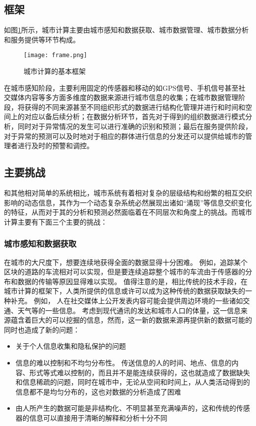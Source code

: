 \subsection{框架}
如图\ref{fig:1.1}所示，城市计算主要由城市感知和数据获取、城市数据管理、城市数据分析和服务提供等环节构成。
\begin{figure}[ht]
\centering
\texttt{[image: frame.png]}
\caption{城市计算的基本框架\cite{zheng2014urban}}
\label{fig:1.1}
\end{figure}
在城市感知阶段，主要利用固定的传感器和移动的如GPS信号、手机信号甚至社交媒体内容等多方面多维度的数据来源进行城市信息的收集；在城市数据管理阶段，将获得的不同来源甚至不同组织形式的数据进行结构化管理并进行和时间和空间上的对应以备后续分析；在数据分析环节，首先对于得到的组织数据进行模式分析，同时对于异常情况的发生可以进行准确的识别和预测；最后在服务提供阶段，对于异常的预测可以及时地对于相应的群体进行信息的分发还可以提供给城市的管理者进行及时的预警和调控。
\subsection{主要挑战}
和其他相对简单的系统相比，城市系统有着相对复杂的层级结构和纷繁的相互交织影响的动态信息，其作为一个动态复杂系统必然展现出诸如“涌现”等信息交织变化的特征\cite{anderson1972more}，从而对于其的分析和预测必然面临着在不同层次和角度上的挑战。而城市计算主要有下面三个主要的挑战：
\subsubsection*{城市感知和数据获取}
在城市的大尺度下，想要连续地获得全面的数据显得十分困难。 例如，追踪某个区块的道路的车流相对可以实现，但是要连续追踪整个城市的车流由于传感器的分布和数据的传输等原因显得难以实现。 值得注意的是，相比传统的技术手段，在城市计算的框架下，人类所提供的信息或许可以成为这种传统的数据获取缺失的一种补充。 例如， 人在社交媒体上公开发表内容可能会提供周边环境的一些诸如交通、天气等的一些信息。 考虑到现代通讯的发达和城市人口的体量，这一信息来源蕴含着巨大的可以挖掘的信息，然而，这一新的数据来源再提供新的数据可能的同时也造成了新的问题：
\begin{itemize}
	\item 关于个人信息收集和隐私保护的问题
	\item 信息的难以控制和不均匀分布性。 传送信息的人的时间、地点、信息的内容、形式等式难以控制的，而且并不是能连续获得的，这也就造成了数据缺失和信息稀疏的问题，同时在城市中，无论从空间和时间上，从人类活动得到的信息都不是均匀分布的，这也对数据的分析造成了困难
	\item 由人所产生的数据可能是非结构化、不明显甚至充满噪声的，这和传统的传感器的信息可以直接用于清晰的解释和分析十分不同
\end{itemize}

